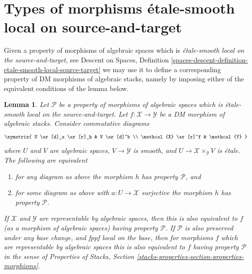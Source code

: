 \documentclass{stacks-project}
\theoremstyle{plain}
\newtheorem{lemma}[subsection]{Lemma}
\theoremstyle{definition}
\theoremstyle{remark}
\numberwithin{equation}{subsection}
\begin{document}
\section{Types of morphisms \'etale-smooth local on source-and-target}
\label{section-etale-smooth-local-source-target}

\noindent
Given a property of morphisms of algebraic spaces which is
{\it \'etale-smooth local on the source-and-target}, see
Descent on Spaces,
Definition \ref{spaces-descent-definition-etale-smooth-local-source-target}
we may use it to define a corresponding
property of DM morphisms of algebraic stacks, namely by imposing either of
the equivalent conditions of the lemma below.

\begin{lemma}
\label{lemma-etale-smooth-local-source-target}
Let $\mathcal{P}$ be a property of morphisms of algebraic spaces
which is \'etale-smooth local on the source-and-target.
Let $f : \mathcal{X} \to \mathcal{Y}$ be a DM morphism of algebraic stacks.
Consider commutative diagrams
$$
\xymatrix{
U \ar[d]_a \ar[r]_h & V \ar[d]^b \\
\mathcal{X} \ar[r]^f & \mathcal{Y}
}
$$
where $U$ and $V$ are algebraic spaces, $V \to \mathcal{Y}$ is smooth,
and $U \to \mathcal{X} \times_\mathcal{Y} V$ is \'etale.
The following are equivalent
\begin{enumerate}
\item for any diagram as above the morphism $h$ has property $\mathcal{P}$, and
\item for some diagram as above with $a : U \to \mathcal{X}$ surjective
the morphism $h$ has property $\mathcal{P}$.
\end{enumerate}
If $\mathcal{X}$ and $\mathcal{Y}$ are representable by algebraic spaces,
then this is also equivalent to $f$ (as a morphism of algebraic spaces)
having property $\mathcal{P}$. If $\mathcal{P}$ is also preserved under
any base change, and fppf local on the base, then for morphisms $f$
which are representable by algebraic spaces this
is also equivalent to $f$ having property $\mathcal{P}$ in the sense
of
Properties of Stacks,
Section \ref{stacks-properties-section-properties-morphisms}.
\end{lemma}
\end{document}
